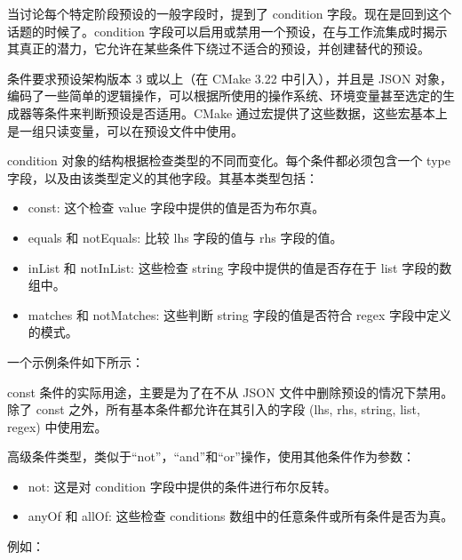 当讨论每个特定阶段预设的一般字段时，提到了 condition 字段。现在是回到这个话题的时候了。condition 字段可以启用或禁用一个预设，在与工作流集成时揭示其真正的潜力，它允许在某些条件下绕过不适合的预设，并创建替代的预设。

条件要求预设架构版本 3 或以上（在 CMake 3.22 中引入），并且是 JSON 对象，编码了一些简单的逻辑操作，可以根据所使用的操作系统、环境变量甚至选定的生成器等条件来判断预设是否适用。CMake 通过宏提供了这些数据，这些宏基本上是一组只读变量，可以在预设文件中使用。

condition 对象的结构根据检查类型的不同而变化。每个条件都必须包含一个 type 字段，以及由该类型定义的其他字段。其基本类型包括：

\begin{itemize}
\item
const: 这个检查 value 字段中提供的值是否为布尔真。

\item
equals 和 notEquals: 比较 lhs 字段的值与 rhs 字段的值。

\item
inList 和 notInList: 这些检查 string 字段中提供的值是否存在于 list 字段的数组中。

\item
matches 和 notMatches: 这些判断 string 字段的值是否符合 regex 字段中定义的模式。
\end{itemize}

一个示例条件如下所示：


const 条件的实际用途，主要是为了在不从 JSON 文件中删除预设的情况下禁用。除了 const 之外，所有基本条件都允许在其引入的字段 (lhs, rhs, string, list, regex) 中使用宏。

高级条件类型，类似于“not”，“and”和“or”操作，使用其他条件作为参数：

\begin{itemize}
\item
not: 这是对 condition 字段中提供的条件进行布尔反转。

\item
anyOf 和 allOf: 这些检查 conditions 数组中的任意条件或所有条件是否为真。
\end{itemize}

例如：


